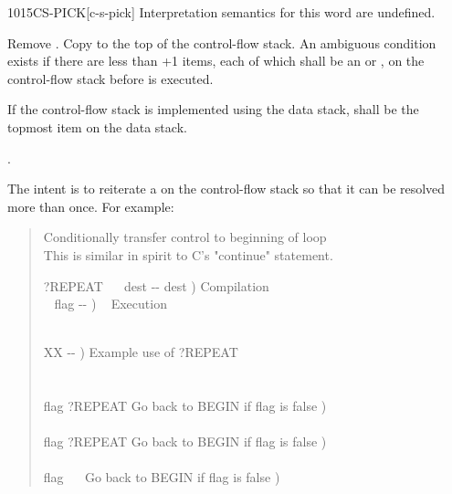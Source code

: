 \begin{worddef}{1015}{CS-PICK}[c-s-pick]
\interpret
	Interpretation semantics for this word are undefined.

\execute

	Remove . Copy  to the top of the
	control-flow stack. An ambiguous condition exists if there
	are less than +1 items, each of which shall be an
	 or , on the control-flow stack
	before  is executed.

	If the control-flow stack is implemented using the data stack,
	 shall be the topmost item on the data stack.

\see {}.

	\begin{rationale} %
		The intent is to reiterate a  on the control-flow
		stack so that it can be resolved more than once. For example:
		\begin{quote}\ttfamily
			 Conditionally transfer control to beginning of loop \\
			 This is similar in spirit to C's "continue" statement.

			\word{:} ?REPEAT ~~ dest -{}- dest )  Compilation \\
			\tab\tab\tab~ flag -{}- ) \tab~ Execution \\
			  ~   \\
			\word{;} 

			\word{:} XX  -{}- )  Example use of ?REPEAT \\
			\tab {} \\
			\tab\tab {\ldots} \\
			\tab flag ?REPEAT  Go back to BEGIN if flag is false ) \\
			\tab\tab {\ldots} \\
			\tab flag ?REPEAT  Go back to BEGIN if flag is false ) \\
			\tab\tab {\ldots} \\
			\tab flag ~~  Go back to BEGIN if flag is false ) \\
			\word{;}
		\end{quote}
	\end{rationale}


\end{worddef}
